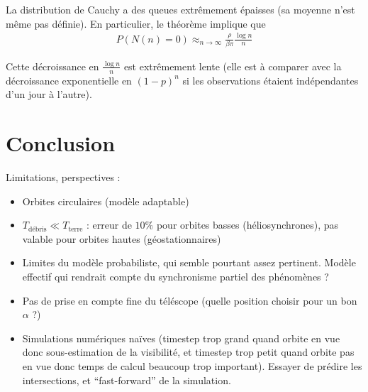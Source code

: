 \documentclass[a4paper,11pt]{article}
\numberwithin{section}{part}
\begin{document}
La distribution de Cauchy a des queues extrêmement épaisses (sa
moyenne n'est même pas définie). En particulier, le théorème implique
que
\begin{align}
  P(N(n) = 0) \approx_{n\to\infty} \frac {\rho}{\beta \pi}\frac{\log n}{n}
\end{align}

Cette décroissance en $\frac {\log n} n$ est extrêmement lente (elle
est à comparer avec la décroissance exponentielle en $(1-p)^{n}$ si
les observations étaient indépendantes d'un jour à l'autre).





\section{Conclusion}
Limitations, perspectives :
\begin{itemize}
\item Orbites circulaires (modèle adaptable)
\item $T_{\text{débris}} \ll T_{\text{terre}}$ : erreur de $10\%$ pour
  orbites basses (héliosynchrones), pas valable pour orbites hautes
  (géostationnaires)
\item Limites du modèle probabiliste, qui semble pourtant assez
  pertinent. Modèle effectif qui rendrait compte du synchronisme
  partiel des phénomènes ?
\item Pas de prise en compte fine du téléscope (quelle position
  choisir pour un bon $\alpha$ ?)
\item Simulations numériques naïves (timestep trop grand quand orbite
  en vue donc sous-estimation de la visibilité, et timestep trop petit
  quand orbite pas en vue donc temps de calcul beaucoup trop
  important). Essayer de prédire les intersections, et
  ``fast-forward'' de la simulation.
\end{itemize}
\end{document}

